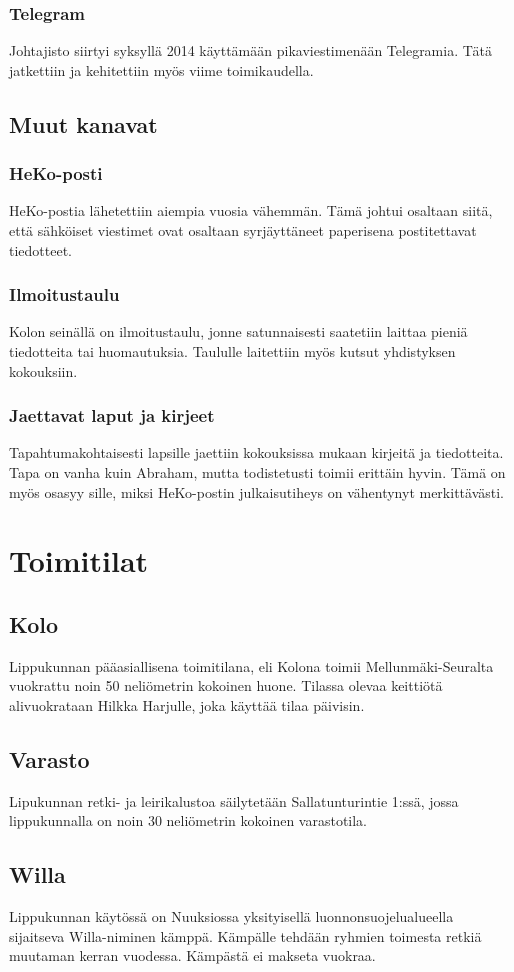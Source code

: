\documentclass[a4paper, 12pt, finnish]{report} %
\begin{document}
\subsubsection{Telegram}
Johtajisto siirtyi syksyllä 2014 käyttämään pikaviestimenään Telegramia. Tätä jatkettiin ja kehitettiin myös viime toimikaudella.
\subsection{Muut kanavat}
\subsubsection{HeKo-posti}
HeKo-postia lähetettiin aiempia vuosia vähemmän. Tämä johtui osaltaan siitä, että sähköiset viestimet ovat osaltaan syrjäyttäneet paperisena postitettavat tiedotteet.
\subsubsection{Ilmoitustaulu}
Kolon seinällä on ilmoitustaulu, jonne satunnaisesti saatetiin laittaa pieniä tiedotteita tai huomautuksia. Taululle laitettiin myös kutsut yhdistyksen kokouksiin.
\subsubsection{Jaettavat laput ja kirjeet}
Tapahtumakohtaisesti lapsille jaettiin kokouksissa mukaan kirjeitä ja tiedotteita. Tapa on vanha kuin Abraham, mutta todistetusti toimii erittäin hyvin. Tämä on myös osasyy sille, miksi HeKo-postin julkaisutiheys on vähentynyt merkittävästi.
\newpage
\section{Toimitilat}
\subsection{Kolo}
Lippukunnan pääasiallisena toimitilana, eli Kolona toimii Mellunmäki-Seuralta vuokrattu noin 50 neliömetrin kokoinen huone. Tilassa olevaa keittiötä alivuokrataan Hilkka Harjulle, joka käyttää tilaa päivisin.
\subsection{Varasto}
Lipukunnan retki- ja leirikalustoa säilytetään Sallatunturintie 1:ssä, jossa lippukunnalla on noin 30 neliömetrin kokoinen varastotila. 
\subsection{Willa}
Lippukunnan käytössä on Nuuksiossa yksityisellä luonnonsuojelualueella sijaitseva Willa-niminen kämppä. Kämpälle tehdään ryhmien toimesta retkiä muutaman kerran vuodessa. Kämpästä ei makseta vuokraa.
\newpage
\end{document}
